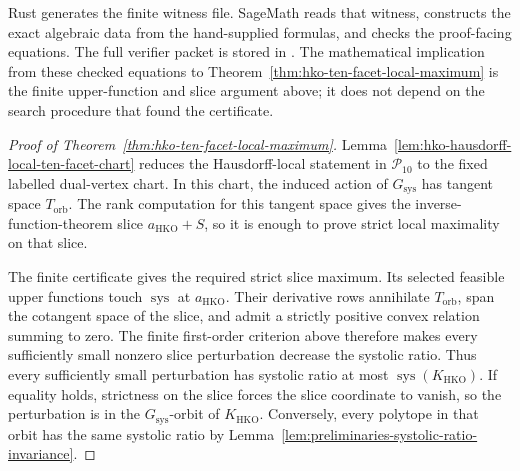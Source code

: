Rust generates the finite witness file. SageMath reads that witness,
constructs the exact algebraic data from the hand-supplied formulas, and checks
the proof-facing equations.
The full verifier packet is stored in
. The mathematical implication
from these checked equations to
Theorem~\ref{thm:hko-ten-facet-local-maximum} is the finite upper-function and
slice argument above; it does not depend on the search procedure that found the
certificate.

\begin{proof}[Proof of Theorem~\ref{thm:hko-ten-facet-local-maximum}]
Lemma~\ref{lem:hko-hausdorff-local-ten-facet-chart} reduces the Hausdorff-local
statement in \(\mathcal P_{10}\) to the fixed labelled dual-vertex chart. In this
chart, the induced action of \(G_{\operatorname{sys}}\) has tangent space
\(T_{\mathrm{orb}}\). The rank computation for this tangent space gives the
inverse-function-theorem slice \(a_{\mathrm{HKO}}+S\), so it is enough to prove
strict local maximality on that slice.

The finite certificate gives the required strict slice maximum. Its selected
feasible upper functions touch \(\operatorname{sys}\) at \(a_{\mathrm{HKO}}\).
Their derivative rows annihilate \(T_{\mathrm{orb}}\), span the cotangent space
of the slice, and admit a strictly positive convex relation summing to zero.
The finite first-order criterion above therefore makes every sufficiently small
nonzero slice perturbation decrease the systolic ratio. Thus every sufficiently
small perturbation has systolic ratio at most
\(\operatorname{sys}(K_{\mathrm{HKO}})\). If equality holds, strictness on the
slice forces the slice coordinate to vanish, so the perturbation is in the
\(G_{\operatorname{sys}}\)-orbit of \(K_{\mathrm{HKO}}\). Conversely, every
polytope in that orbit has the same systolic ratio by
Lemma~\ref{lem:preliminaries-systolic-ratio-invariance}.
\end{proof}
